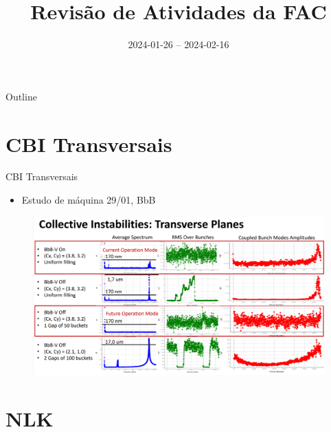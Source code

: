 \documentclass{beamer}					  %
\title{Revisão de Atividades da FAC}	%
\institute{LNLS.DAC.FAC}				%
\date{2024-01-26 -- 2024-02-16}			%
\begin{document}
\begin{frame}
  \titlepage
  \href{https://github.com/lnls-fac/doc-review-dac-fac}{}
  \href{https://www.overleaf.com/read/sbdjxtzfchrm}{}
\end{frame}

\begin{frame}{Outline}
  \tableofcontents
\end{frame}




\section{CBI Transversais}

\begin{frame}{CBI Transversais}
    \scriptsize{\begin{itemize}
            \item Estudo de máquina 29/01, BbB
    \end{itemize}}
    \begin{figure}[H]
        	\centering
            \includegraphics[width=1.0\textwidth]{2024-02-16/figures/cbi-transversais.png}
            \label{fig:cbi-transversal}
    \end{figure} 
\end{frame}



\section{NLK}
\end{document}
